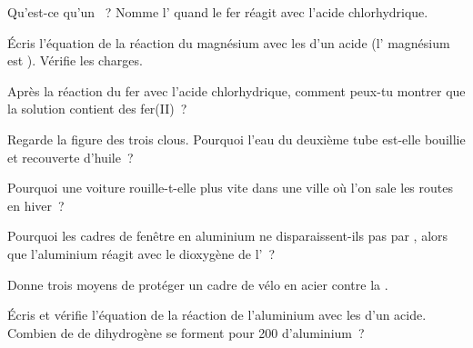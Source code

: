 \begin{exercise}[$\star$]\label{exo:g9:metals-acids-corrosion:4}
Qu'est-ce qu'un ~? Nomme l' quand le fer
réagit avec l'acide chlorhydrique.
\end{exercise}

\begin{exercise}[$\star\star$]\label{exo:g9:metals-acids-corrosion:5}
Écris l'équation de la réaction du magnésium avec les   d'un
acide (l' magnésium est ). Vérifie les charges.
\end{exercise}

\begin{exercise}[$\star\star$]\label{exo:g9:metals-acids-corrosion:6}
Après la réaction du fer avec l'acide chlorhydrique, comment peux-tu
montrer que la solution contient des  fer(II)~?
\end{exercise}

\begin{exercise}[$\star\star$]\label{exo:g9:metals-acids-corrosion:7}
Regarde la figure des trois clous. Pourquoi l'eau du deuxième tube
est-elle bouillie et recouverte d'huile~?
\end{exercise}

\begin{exercise}[$\star\star$]\label{exo:g9:metals-acids-corrosion:8}
Pourquoi une voiture rouille-t-elle plus vite dans une ville où l'on
sale les routes en hiver~?
\end{exercise}

\begin{exercise}[$\star\star$]\label{exo:g9:metals-acids-corrosion:9}
Pourquoi les cadres de fenêtre en aluminium ne disparaissent-ils pas
par , alors que l'aluminium réagit avec le dioxygène de
l'~?
\end{exercise}

\begin{exercise}[$\star\star$]\label{exo:g9:metals-acids-corrosion:10}
Donne trois moyens de protéger un cadre de vélo en acier contre la
.
\end{exercise}

\begin{exercise}[$\star\star\star$]\label{exo:g9:metals-acids-corrosion:11}
Écris et vérifie l'équation de la réaction de l'aluminium avec les 
 d'un acide. Combien de  de dihydrogène se forment pour
200  d'aluminium~?
\end{exercise}

